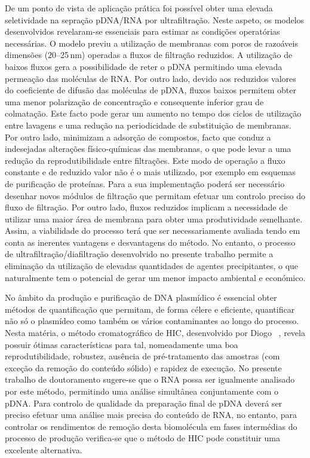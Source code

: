 De um ponto de vista de aplicação prática foi possível obter uma elevada seletividade na sepração pDNA/RNA por ultrafiltração. Neste aspeto, os modelos desenvolvidos revelaram-se essenciais para estimar as condições operatórias necessárias. O modelo previu a utilização de membranas com poros de razoáveis dimensões (20--25\,nm) operadas a fluxos de filtração reduzidos. A utilização de baixos fluxos gera a possibilidade de reter o pDNA permitindo uma elevada permeação das moléculas de RNA. Por outro lado, devido aos reduzidos valores do coeficiente de difusão das moléculas de pDNA, fluxos baixos permitem obter uma menor polarização de concentração e consequente inferior grau de colmatação. Este facto pode gerar um aumento no tempo dos ciclos de utilização entre lavagens e uma redução na periodicidade de substituição de membranas. Por outro lado, minimizam a adsorção de compostos, facto que conduz a indesejadas alterações físico-químicas das membranas, o que pode levar a uma redução da reprodutibilidade entre filtrações. Este modo de operação a fluxo constante e de reduzido valor não é o mais utilizado, por exemplo em esquemas de purificação de proteínas. Para a sua implementação poderá ser necessário desenhar novos módulos de filtração que permitam efetuar um controlo preciso do fluxo de filtração. Por outro lado, fluxos reduzidos implicam a necessidade de utilizar uma maior área de membrana para obter uma produtividade semelhante. Assim, a viabilidade do processo terá que ser necessariamente avaliada tendo em conta as inerentes vantagens e desvantagens do método. No entanto, o processo de ultrafiltração/diafiltração desenvolvido no presente trabalho permite a eliminação da utilização de elevadas quantidades de agentes precipitantes, o que naturalmente tem o potencial de gerar um menor impacto ambiental e económico.   

No âmbito da produção e purificação de DNA plasmídico é essencial obter métodos de quantificação que permitam, de forma célere e eficiente, quantificar não só o plasmídeo como também os vários contaminantes ao longo do processo. Nesta matéria, o método cromatográfico de HIC, desenvolvido por Diogo \et\ \cite{diogo}, revela possuir ótimas características para tal, nomeadamente uma boa reprodutibilidade, robustez, ausência de pré-tratamento das amostras (com exceção da remoção do conteúdo sólido) e rapidez de execução. No presente trabalho de doutoramento sugere-se que o RNA possa ser igualmente analisado por este método, permitindo uma análise simultânea conjuntamente com o pDNA. Para controlo de qualidade da preparação final de pDNA deverá ser preciso efetuar uma análise mais precisa do conteúdo de RNA, no entanto, para controlar os rendimentos de remoção desta biomolécula em fases intermédias do processo de produção verifica-se que o método de HIC pode constituir uma excelente alternativa.

